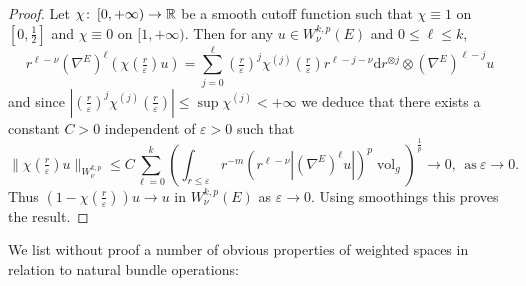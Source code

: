 \documentclass{article}
\numberwithin{equation}{section}        %
\theoremstyle{bfnote}
\theoremstyle{definition}
\theoremstyle{bfremark}
\newcommand{\col}{\colon \thinspace}        %
\newcommand{\R}{\mathbb{R}}                 %
\newcommand{\diff}{\mathrm{d}}                      %
\DeclareMathOperator{\vol}{vol}                 %
\begin{document}
\begin{proof}
    Let $\chi \col [0,+\infty) \to \R$ be a smooth cutoff function such that $\chi \equiv 1$ on $[0,\frac{1}{2}]$ and $\chi \equiv 0$ on $[1,+\infty)$. Then for any $u \in W^{k,p}_\nu(E)$ and $0 \leq \ell \leq k$,
    \begin{equation*}
        r^{\ell-\nu}(\nabla^E)^\ell(\chi(\tfrac{r}{\varepsilon})u) = \sum_{j=0}^\ell (\tfrac{r}{\varepsilon})^j \chi^{(j)}(\tfrac{r}{\varepsilon}) r^{\ell-j-\nu} \diff r^{\otimes j} \otimes (\nabla^E)^{\ell-j} u
    \end{equation*}
    and since $|(\frac{r}{\varepsilon})^j \chi^{(j)}(\frac{r}{\varepsilon})| \leq \sup \chi^{(j)} < + \infty$ we deduce that there exists a constant $C > 0$ independent of $\varepsilon > 0$ such that
    \begin{equation*}
        \|\chi(\tfrac{r}{\varepsilon}) u\|_{W^{k,p}_\nu} \leq C \sum_{\ell = 0}^k \left( \int_{r \leq \varepsilon} r^{-m} (r^{\ell-\nu} |(\nabla^E)^\ell u|)^p \vol_g \right)^{\frac{1}{p}} \longrightarrow 0, ~~ \text{as} ~ \varepsilon \to 0 .
    \end{equation*}
    Thus $(1-\chi(\frac{r}{\varepsilon})) u \to u$ in $W^{k,p}_\nu(E)$ as $\varepsilon \to 0$. Using smoothings this proves the result.
\end{proof}

We list without proof a number of obvious properties of weighted spaces in relation to natural bundle operations:
\end{document}
